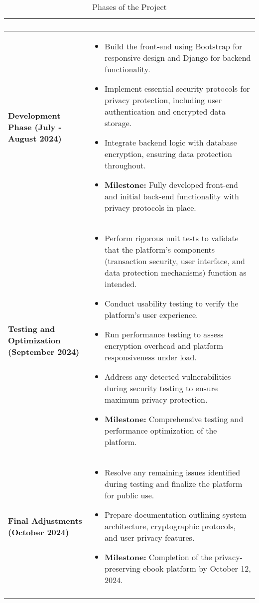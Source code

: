 \documentclass[12pt]{article}
\begin{document}
\begin{longtable}{|>{\bfseries}m{5cm}|m{10cm}|}
\begin{itemize}
	\end{itemize}
	\\
	\hline
	Development Phase (July - August 2024) & 
	\begin{itemize}
		\item Build the front-end using Bootstrap for responsive design and Django for backend functionality.
		\item Implement essential security protocols for privacy protection, including user authentication and encrypted data storage.
		\item Integrate backend logic with database encryption, ensuring data protection throughout.
		\item \textbf{Milestone:} Fully developed front-end and initial back-end functionality with privacy protocols in place.
	\end{itemize}
	\\
	\hline
	Testing and Optimization (September 2024) & 
	\begin{itemize}
		\item Perform rigorous unit tests to validate that the platform’s components (transaction security, user interface, and data protection mechanisms) function as intended.
		\item Conduct usability testing to verify the platform’s user experience.
		\item Run performance testing to assess encryption overhead and platform responsiveness under load.
		\item Address any detected vulnerabilities during security testing to ensure maximum privacy protection.
		\item \textbf{Milestone:} Comprehensive testing and performance optimization of the platform.
	\end{itemize}
	\\
	\hline
	Final Adjustments (October 2024) & 
	\begin{itemize}
		\item Resolve any remaining issues identified during testing and finalize the platform for public use.
		\item Prepare documentation outlining system architecture, cryptographic protocols, and user privacy features.
		\item \textbf{Milestone:} Completion of the privacy-preserving ebook platform by October 12, 2024.
	\end{itemize}
	\\
	\hline
	\caption{Phases of the Project}
\end{longtable}
\end{document}
